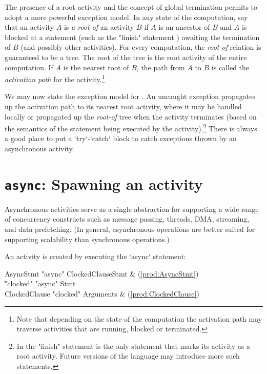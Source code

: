 The presence of a root activity and the concept of global termination permits
\Xten{} to adopt a more powerful exception model. In any state of the
computation, say that an activity $A$ is {\em a root of} an activity $B$ if
$A$ is an ancestor of $B$ and $A$ is blocked at a statement (such as the
\xcd"finish" statement ) awaiting the termination of $B$ (and
possibly other activities). For every \Xten{} computation, the \emph{root-of}
relation is guaranteed to be a tree. The root of the tree is the root activity
of the entire computation. If $A$ is the nearest root of $B$, the path from
$A$ to $B$ is called the {\em activation path} for the activity.\footnote{Note
  that depending on the state of the computation the activation path may
  traverse activities that are running, blocked or terminated.}

We may now state the exception model for \Xten.  An uncaught exception
propagates up the activation path to its nearest root activity, where
it may be handled locally or propagated up the \emph{root-of} tree when
the activity terminates (based on the semantics of the statement being
executed by the activity).\footnote{In \XtenCurrVer{} the \xcd"finish"
statement is the only statement that marks its activity as a root
activity. Future versions of the language may introduce more such
statements.}  
There is always a good place to put a \xcd`try`-\xcd`catch` block to catch
exceptions thrown by an asynchronous activity.

\section{{\tt async}: Spawning an activity}\label{AsynchronousActivity}\label{AsyncActivity}

Asynchronous activities serve as a single abstraction for supporting a
wide range of concurrency constructs such as message passing, threads,
DMA, streaming, and data prefetching. (In general, asynchronous operations
are better suited for supporting scalability than synchronous
operations.)

An activity is created by executing the \xcd`async` statement: 

\begin{bbgrammar}
           AsyncStmt \: \xcd"async" ClockedClause\opt Stmt & (\ref{prod:AsyncStmt}) \\
                     \| \xcd"clocked" \xcd"async" Stmt \\
       ClockedClause \: \xcd"clocked" Arguments & (\ref{prod:ClockedClause}) \\
\end{bbgrammar}


